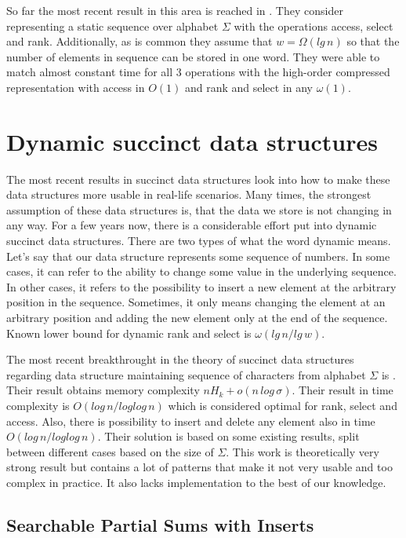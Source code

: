So far the most recent result in this area is reached in \cite{belazzougui2015optimal}. They consider representing a static sequence over alphabet $\Sigma$ with the operations access, select and rank. Additionally, as is common they assume that $w=\Omega(lg\,n)$ so that the number of elements in sequence can be stored in one word. They were able to match almost constant time for all 3 operations with the high-order compressed representation with access in $O(1)$ and rank and select in any $\omega(1)$. 

\section{Dynamic succinct data structures}

The most recent results in succinct data structures look into how to make these data structures more usable in real-life scenarios. Many times, the
strongest assumption of these data structures is, that the data we store is not changing in any way. For a few years now, there is a considerable effort put into dynamic succinct data structures. There are two types of what the word dynamic means. Let's say that our data structure represents some sequence of numbers. In some cases, it can refer to the ability to change some value in the underlying sequence. In other cases, it refers to the possibility to insert a new element at the arbitrary position in the sequence. Sometimes, it only means changing the element at an arbitrary position and adding the new element only at the end of the sequence. Known lower bound for dynamic rank and select is $\omega(lg\,n/lg\,w)$\cite{beame2002optimal}.

The most recent breakthrought in the theory of succinct data structures regarding data structure maintaining sequence of characters from alphabet $\Sigma$ is \cite{munro2015compressed}. Their result obtains memory complexity $nH_k+o(n\,log\,\sigma)$. Their result in time complexity is $O(log\,n/log log\,n)$ which is considered optimal for rank, select and access. Also, there is possibility to insert and delete any element also in time $O(log\,n/log log\,n)$. Their solution is based on some existing results, split between different cases based on the size of $\Sigma$. This work is theoretically very strong result but contains a lot of patterns that make it not very usable and too complex in practice. It also lacks implementation to the best of our knowledge.

\subsection{Searchable Partial Sums with Inserts}

